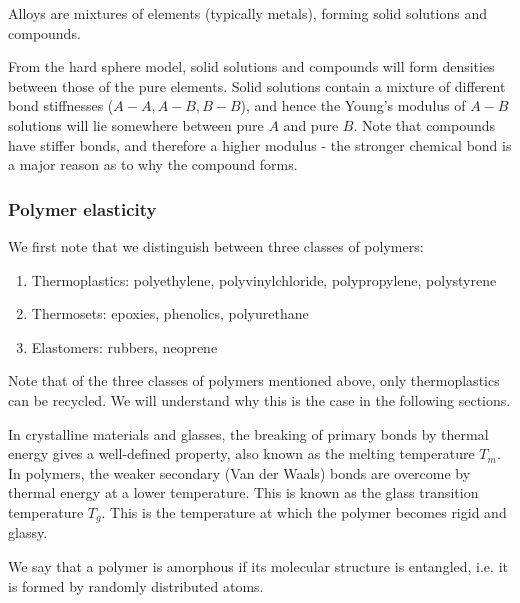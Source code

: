 \documentclass{article}
\begin{document}
\begin{definition}[Alloys]
    Alloys are mixtures of elements (typically metals), forming solid solutions and compounds.
\end{definition}

From the hard sphere model, solid solutions and compounds will form densities between those of the pure elements. Solid solutions contain a mixture of different bond stiffnesses  ($A-A, A-B, B-B$), and hence the Young's modulus of $A-B$ solutions will lie somewhere between pure $A$ and pure $B$. Note that compounds have stiffer bonds, and therefore a higher modulus - the stronger chemical bond is a major reason as to why the compound forms.

\subsubsection{Polymer elasticity}

We first note that we distinguish between three classes of polymers:

\begin{enumerate}
    \item Thermoplastics: polyethylene, polyvinylchloride, polypropylene, polystyrene
    \item Thermosets: epoxies, phenolics, polyurethane
    \item Elastomers: rubbers, neoprene
\end{enumerate}

Note that of the three classes of polymers mentioned above, only thermoplastics can be recycled. We will understand why this is the case in the following sections.

\begin{definition}
    In crystalline materials and glasses, the breaking of primary bonds by thermal energy gives a well-defined property, also known as the melting temperature $T_m$. In polymers, the weaker secondary (Van der Waals) bonds are overcome by thermal energy at a lower temperature. This is known as the glass transition temperature $T_g$. This is the temperature at which the polymer becomes rigid and glassy.
\end{definition}

\begin{definition}
    We say that a polymer is amorphous if its molecular structure is entangled, i.e. it is formed by randomly distributed atoms.
\end{definition}
\end{document}
